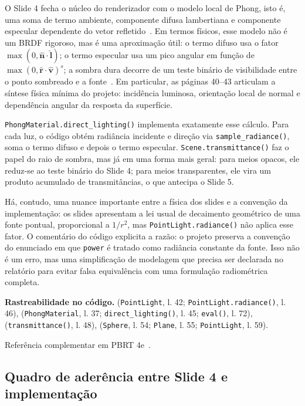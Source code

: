 \documentclass[portuguese]{sbcreviews-2025}%
\newcommand{\slidescite}[2]{\citep[pp.~#2]{#1}}
\newcommand{\pbrtsec}[1]{PBRT 4e~\citep[Se\c{c}\~ao~#1]{pharr2023pbrt}}
\begin{document}
O Slide 4 fecha o núcleo do renderizador com o modelo local de Phong, isto é, uma soma de termo ambiente, componente difusa lambertiana e componente especular dependente do vetor refletido~\slidescite{inf2608slides04}{40--43, 54--55}. Em termos físicos, esse modelo não é um BRDF rigoroso, mas é uma aproximação útil: o termo difuso usa o fator $\max(0,\hat{\mathbf{n}}\cdot\hat{\mathbf{l}})$; o termo especular usa um pico angular em função de $\max(0,\hat{\mathbf{r}}\cdot\hat{\mathbf{v}})^s$; a sombra dura decorre de um teste binário de visibilidade entre o ponto sombreado e a fonte~\slidescite{inf2608slides04}{51--53}. Em particular, as páginas 40--43 articulam a síntese física mínima do projeto: incidência luminosa, orientação local de normal e dependência angular da resposta da superfície.

\texttt{PhongMaterial.direct\_lighting()} implementa exatamente esse cálculo. Para cada luz, o código obtém radiância incidente e direção via \texttt{sample\_radiance()}, soma o termo difuso e depois o termo especular. \texttt{Scene.transmittance()} faz o papel do raio de sombra, mas já em uma forma mais geral: para meios opacos, ele reduz-se ao teste binário do Slide 4; para meios transparentes, ele vira um produto acumulado de transmitâncias, o que antecipa o Slide 5.

Há, contudo, uma nuance importante entre a física dos slides e a convenção da implementação: os slides apresentam a lei usual de decaimento geométrico de uma fonte pontual, proporcional a $1/r^2$, mas \texttt{PointLight.radiance()} não aplica esse fator. O comentário do código explicita a razão: o projeto preserva a convenção do enunciado em que \texttt{power} é tratado como radiância constante da fonte. Isso não é um erro, mas uma simplificação de modelagem que precisa ser declarada no relatório para evitar falsa equivalência com uma formulação radiométrica completa.

\noindent\textbf{Rastreabilidade no código.}  (\texttt{PointLight}, l. 42; \texttt{PointLight.radiance()}, l. 46),  (\texttt{PhongMaterial}, l. 37; \texttt{direct\_lighting()}, l. 45; \texttt{eval()}, l. 72),  (\texttt{transmittance()}, l. 48),  (\texttt{Sphere}, l. 54; \texttt{Plane}, l. 55; \texttt{PointLight}, l. 59).

Referência complementar em \pbrtsec{1.2}.

\subsection{Quadro de aderência entre Slide 4 e implementação}
\label{sec:slide4-quadro}
\end{document}
